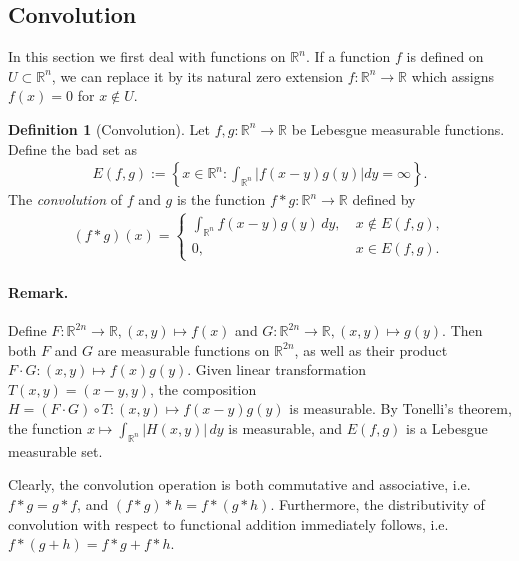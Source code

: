 \documentclass{article}
\numberwithin{equation}{section}
\newcommand{\bbR}{\mathbb{R}}
\theoremstyle{plain}
\theoremstyle{definition}
\newtheorem{definition}[theorem]{Definition}
\begin{document}
\subsection{Convolution}
In this section we first deal with functions on $\bbR^n$. If a function $f$ is defined on $U\subset\bbR^n$, we can replace it by its natural zero extension $f:\bbR^n\to\bbR$ which assigns $f(x)=0$ for $x\notin U$.
\begin{definition}[Convolution]
\label{def:1.1} Let $f,g:\bbR^n\to\mathbb{R}$ be Lebesgue measurable functions. Define the bad set as
\begin{align*}
	E(f,g) := \left\{x\in\bbR^n:\int_{\bbR^n}\left\vert f(x-y)g(y)\right\vert dy = \infty\right\}.
\end{align*}
The \textit{convolution} of $f$ and $g$ is the function $f * g:\mathbb{R}^n\to\mathbb{R}$ defined by
\begin{align*}
	(f*g)(x) = \begin{cases}
		\int_{\bbR^n} f(x-y)g(y)\,dy,\ &x\notin E(f,g),\\
		0,\ &x\in E(f,g).
	\end{cases}
\end{align*}
\end{definition}
\paragraph{Remark.} Define $F:\bbR^{2n}\to\mathbb{R},(x,y)\mapsto f(x)$ and $G:\bbR^{2n}\to\mathbb{R},(x,y)\mapsto g(y)$. Then both $F$ and $G$ are measurable functions on $\mathbb{R}^{2n}$, as well as their product $F\cdot G:(x,y)\mapsto f(x)g(y)$. Given linear transformation $T(x,y)=(x-y,y)$, the composition $H=(F\cdot G)\circ T: (x,y)\mapsto f(x-y)g(y)$ is measurable. By Tonelli's theorem, the function $x\mapsto\int_{\bbR^n}\vert H(x,y)\vert\,dy$ is measurable, and $E(f,g)$ is a Lebesgue measurable set.

Clearly, the convolution operation is both commutative and associative, i.e. $f*g=g*f$, and $(f*g)*h = f*(g*h)$. Furthermore, the distributivity of convolution with respect to functional addition immediately follows, i.e. $f*(g+h)=f*g+f*h$.
\end{document}
